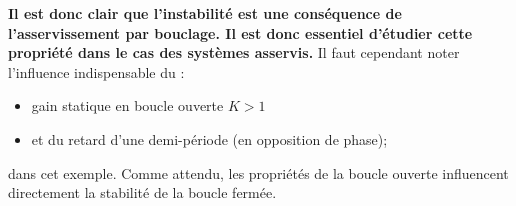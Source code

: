 \textbf{Il est donc clair que l'instabilité est une conséquence de 
l'asservissement par bouclage. Il est donc essentiel d'étudier 
cette propriété dans le cas des systèmes asservis.}
Il faut cependant noter l'influence indispensable du :
\begin{itemize}
    \item gain statique en boucle ouverte $K>1$
    \item et du retard d'une demi-période (en opposition de phase); 
\end{itemize}
dans cet exemple. Comme attendu, les propriétés de la boucle ouverte
influencent directement la stabilité de la boucle fermée.
